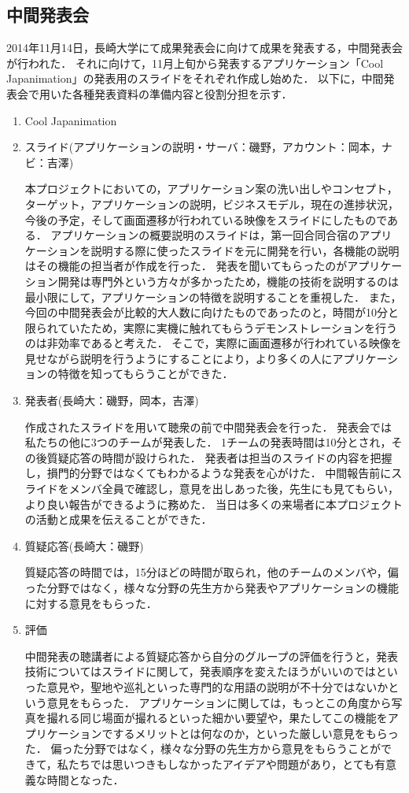 \subsection{中間発表会} 
\par
2014年11月14日，長崎大学にて成果発表会に向けて成果を発表する，中間発表会が行われた．
それに向けて，11月上旬から発表するアプリケーション「Cool Japanimation」の発表用のスライドをそれぞれ作成し始めた．
以下に，中間発表会で用いた各種発表資料の準備内容と役割分担を示す．
\begin{enumerate}
\item Cool Japanimation　
\par
\item スライド(アプリケーションの説明・サーバ：磯野，アカウント：岡本，ナビ：吉澤) 
\par
本プロジェクトにおいての，アプリケーション案の洗い出しやコンセプト，ターゲット，アプリケーションの説明，ビジネスモデル，現在の進捗状況，今後の予定，そして画面遷移が行われている映像をスライドにしたものである．
アプリケーションの概要説明のスライドは，第一回合同合宿のアプリケーションを説明する際に使ったスライドを元に開発を行い，各機能の説明はその機能の担当者が作成を行った．
発表を聞いてもらったのがアプリケーション開発は専門外という方々が多かったため，機能の技術を説明するのは最小限にして，アプリケーションの特徴を説明することを重視した．
また，今回の中間発表会が比較的大人数に向けたものであったのと，時間が10分と限られていたため，実際に実機に触れてもらうデモンストレーションを行うのは非効率であると考えた．
そこで，実際に画面遷移が行われている映像を見せながら説明を行うようにすることにより，より多くの人にアプリケーションの特徴を知ってもらうことができた．
\item 発表者(長崎大：磯野，岡本，吉澤)
\par
作成されたスライドを用いて聴衆の前で中間発表会を行った．
発表会では私たちの他に3つのチームが発表した．
1チームの発表時間は10分とされ，その後質疑応答の時間が設けられた．
発表者は担当のスライドの内容を把握し，損門的分野ではなくてもわかるような発表を心がけた．
中間報告前にスライドをメンバ全員で確認し，意見を出しあった後，先生にも見てもらい，より良い報告ができるように務めた．
当日は多くの来場者に本プロジェクトの活動と成果を伝えることができた． 
\item 質疑応答(長崎大：磯野) 
\par
質疑応答の時間では，15分ほどの時間が取られ，他のチームのメンバや，偏った分野ではなく，様々な分野の先生方から発表やアプリケーションの機能に対する意見をもらった． 
\item 評価 
\par
中間発表の聴講者による質疑応答から自分のグループの評価を行うと，発表技術についてはスライドに関して，発表順序を変えたほうがいいのではといった意見や，聖地や巡礼といった専門的な用語の説明が不十分ではないかという意見をもらった．
アプリケーションに関しては，もっとこの角度から写真を撮れる同じ場面が撮れるといった細かい要望や，果たしてこの機能をアプリケーションでするメリットとは何なのか，といった厳しい意見をもらった．
偏った分野ではなく，様々な分野の先生方から意見をもらうことができて，私たちでは思いつきもしなかったアイデアや問題があり，とても有意義な時間となった．
\end{enumerate}　
\par
{}
